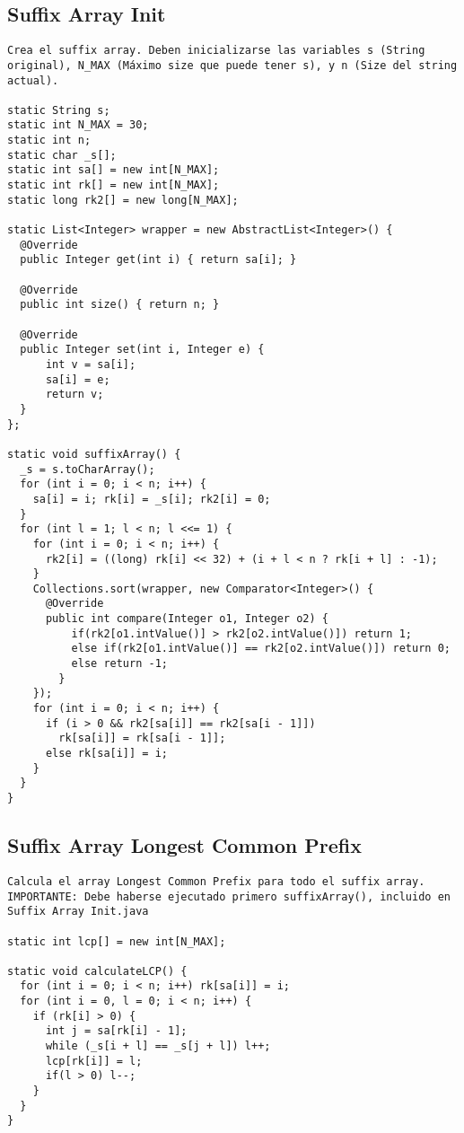 \documentclass[10pt,letterpaper,twocolumn,twosided]{article}
\begin{document}
\subsection{Suffix Array Init}
\begin{lstlisting}
Crea el suffix array. Deben inicializarse las variables s (String original), N_MAX (Máximo size que puede tener s), y n (Size del string actual).

static String s;
static int N_MAX = 30; 
static int n;
static char _s[];
static int sa[] = new int[N_MAX]; 
static int rk[] = new int[N_MAX];
static long rk2[] = new long[N_MAX];

static List<Integer> wrapper = new AbstractList<Integer>() {
  @Override
  public Integer get(int i) { return sa[i]; }

  @Override
  public int size() { return n; }

  @Override
  public Integer set(int i, Integer e) { 
      int v = sa[i];
      sa[i] = e;
      return v;
  }
};

static void suffixArray() {
  _s = s.toCharArray();
  for (int i = 0; i < n; i++) {
    sa[i] = i; rk[i] = _s[i]; rk2[i] = 0;
  }
  for (int l = 1; l < n; l <<= 1) {
    for (int i = 0; i < n; i++) {
      rk2[i] = ((long) rk[i] << 32) + (i + l < n ? rk[i + l] : -1);
    }
    Collections.sort(wrapper, new Comparator<Integer>() {
      @Override
      public int compare(Integer o1, Integer o2) {
          if(rk2[o1.intValue()] > rk2[o2.intValue()]) return 1;
          else if(rk2[o1.intValue()] == rk2[o2.intValue()]) return 0;
          else return -1;
        }
    });
    for (int i = 0; i < n; i++) {
      if (i > 0 && rk2[sa[i]] == rk2[sa[i - 1]]) 
        rk[sa[i]] = rk[sa[i - 1]]; 
      else rk[sa[i]] = i;
    }
  }
}\end{lstlisting}

\subsection{Suffix Array Longest Common Prefix}
\begin{lstlisting}
Calcula el array Longest Common Prefix para todo el suffix array. IMPORTANTE: Debe haberse ejecutado primero suffixArray(), incluido en Suffix Array Init.java

static int lcp[] = new int[N_MAX];

static void calculateLCP() {
  for (int i = 0; i < n; i++) rk[sa[i]] = i;
  for (int i = 0, l = 0; i < n; i++) {
    if (rk[i] > 0) {
      int j = sa[rk[i] - 1];
      while (_s[i + l] == _s[j + l]) l++;
      lcp[rk[i]] = l;
      if(l > 0) l--;
    }
  }
}\end{lstlisting}
\end{document}
